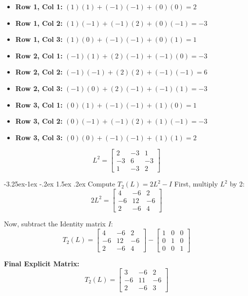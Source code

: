 \documentclass[twoside, 10pt]{article}
\makeatletter
\renewcommand{\paragraph}{\@startsection{paragraph}{4}{\z@}%
    {-3.25ex\@plus -1ex \@minus -.2ex}%
    {1.5ex \@plus .2ex}%
    {\normalfont\normalsize\bfseries}}
\makeatother
\begin{document}
\begin{itemize}
    \item \textbf{Row 1, Col 1:} $(1)(1) + (-1)(-1) + (0)(0) = 2$
    \item \textbf{Row 1, Col 2:} $(1)(-1) + (-1)(2) + (0)(-1) = -3$
    \item \textbf{Row 1, Col 3:} $(1)(0) + (-1)(-1) + (0)(1) = 1$
    \item \textbf{Row 2, Col 1:} $(-1)(1) + (2)(-1) + (-1)(0) = -3$
    \item \textbf{Row 2, Col 2:} $(-1)(-1) + (2)(2) + (-1)(-1) = 6$
    \item \textbf{Row 2, Col 3:} $(-1)(0) + (2)(-1) + (-1)(1) = -3$
    \item \textbf{Row 3, Col 1:} $(0)(1) + (-1)(-1) + (1)(0) = 1$
    \item \textbf{Row 3, Col 2:} $(0)(-1) + (-1)(2) + (1)(-1) = -3$
    \item \textbf{Row 3, Col 3:} $(0)(0) + (-1)(-1) + (1)(1) = 2$
\end{itemize}

\[
L^2 = \begin{bmatrix} 2 & -3 & 1 \\ -3 & 6 & -3 \\ 1 & -3 & 2 \end{bmatrix}
\]

\paragraph{Compute $T_2(L) = 2L^2 - I$}
First, multiply $L^2$ by 2:
\[
2L^2 = \begin{bmatrix} 4 & -6 & 2 \\ -6 & 12 & -6 \\ 2 & -6 & 4 \end{bmatrix}
\]

Now, subtract the Identity matrix $I$:
\[
T_2(L) = \begin{bmatrix} 4 & -6 & 2 \\ -6 & 12 & -6 \\ 2 & -6 & 4 \end{bmatrix} - \begin{bmatrix} 1 & 0 & 0 \\ 0 & 1 & 0 \\ 0 & 0 & 1 \end{bmatrix}
\]

\textbf{Final Explicit Matrix:}
\[
T_2(L) = \begin{bmatrix} 3 & -6 & 2 \\ -6 & 11 & -6 \\ 2 & -6 & 3 \end{bmatrix}
\]
\end{document}
